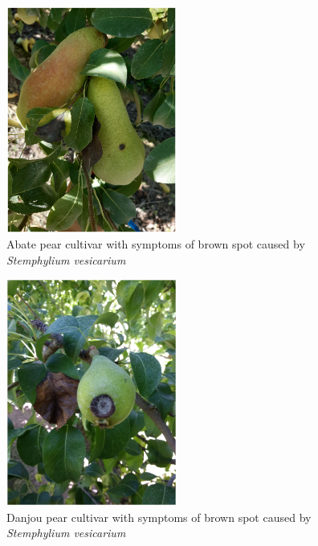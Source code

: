\documentclass[
  letterpaper,
  DIV=11,
  numbers=noendperiod]{scrreport}
\begin{document}
\begin{figure}

{\centering \includegraphics[width=0.5\textwidth,height=\textheight]{images/abate_border.png}

}

\caption{Abate pear cultivar with symptoms of brown spot caused by
\emph{Stemphylium vesicarium}}

\end{figure}

\begin{figure}

{\centering \includegraphics[width=0.5\textwidth,height=\textheight]{images/danjou_border.png}

}

\caption{Danjou pear cultivar with symptoms of brown spot caused by
\emph{Stemphylium vesicarium}}

\end{figure}
\end{document}
